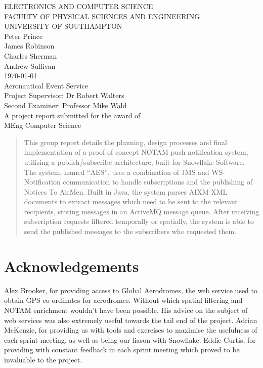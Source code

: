 \documentclass[a4paper, 12pt, twoside]{article}
\begin{document}
\begin{titlepage}

	\center

	{\large ELECTRONICS AND COMPUTER SCIENCE}\\[0.2cm]
	{\large FACULTY OF PHYSICAL SCIENCES AND ENGINEERING}\\[0.2cm]
	{\large UNIVERSITY OF SOUTHAMPTON}\\[3cm]

	{\Large Peter Prince}\\[0.2cm]
	{\Large James Robinson}\\[0.2cm]
	{\Large Charles Sherman}\\[0.2cm]
	{\Large Andrew Sullivan}\\[1cm]
	{\Large \today}\\[3cm]

	{\LARGE Aeronautical Event Service}\\[3cm]

	{\large Project Supervisor: Dr Robert Walters}\\[0.2cm]
	{\large Second Examiner: Professor Mike Wald}\\[2.5cm]

	{\large A project report submitted for the award of}\\[0.2cm]
	{\Large MEng Computer Science}

\end{titlepage}

\begin{abstract}

This group report details the planning, design processes and final implementation of a proof of concept NOTAM push notification system, utilising a publish/subscribe architecture, built for Snowflake Software. The system, named ``AES'', uses a combination of JMS and WS-Notification communication to handle subscriptions and the publishing of Notices To AirMen. Built in Java, the system parses AIXM XML documents to extract messages which need to be sent to the relevant recipients, storing messages in an ActiveMQ message queue. After receiving subscription requests filtered temporally or spatially, the system is able to send the published messages to the subscribers who requested them. 

\end{abstract}

\newpage

\section*{Acknowledgements}
Alex Brooker, for providing access to Global Aerodromes, the web service used to obtain GPS co-ordinates for aerodromes. Without which spatial filtering and NOTAM enrichment wouldn't have been possible. His advice on the subject of web services was also extremely useful towards the tail end of the project.
Adrian McKenzie, for providing us with tools and exercises to maximise the usefulness of each sprint meeting, as well as being our liason with Snowflake.
Eddie Curtis, for providing with constant feedback in each sprint meeting which proved to be invaluable to the project.
\end{document}
